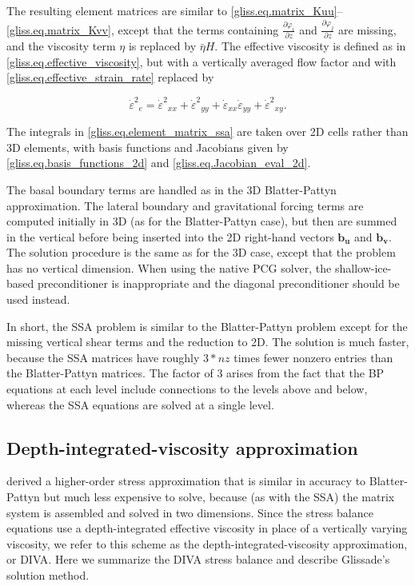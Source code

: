 {\noindent
The resulting element matrices are similar to \eqref{gliss.eq.matrix_Kuu}--\eqref{gliss.eq.matrix_Kvv},
except that the terms containing $\frac{\partial {{\varphi }_{i}}}{\partial z}$ and
$\frac{\partial {{\varphi }_{j}}}{\partial z}$ are missing, and the viscosity term $\eta$
is replaced by $\bar{\eta} H$.  The effective viscosity is defined as in \eqref{gliss.eq.effective_viscosity},
but with a vertically averaged flow factor and with \eqref{gliss.eq.effective_strain_rate} replaced by

\begin{equation}
  \label{gliss.eq.effective_strain_rate_ssa}
        {{\dot{\varepsilon }}^{2}}_{e} = 
        {{\dot{\varepsilon }}^{2}}_{xx} + {{\dot{\varepsilon }}^{2}}_{yy} + 
        {{\dot{\varepsilon }}_{xx}}{{\dot{\varepsilon }}_{yy}} + {{\dot{\varepsilon }}^{2}}_{xy}.
\end{equation}

\noindent
The integrals in \eqref{gliss.eq.element_matrix_ssa} are taken over 2D cells rather than 3D elements,
with basis functions and Jacobians given by \eqref{gliss.eq.basis_functions_2d}
and \eqref{gliss.eq.Jacobian_eval_2d}.

The basal boundary terms are handled as in the 3D Blatter-Pattyn approximation. 
The lateral boundary and gravitational forcing terms are computed initially in 3D
(as for the Blatter-Pattyn case), but then are summed in the vertical before being
inserted into the 2D right-hand vectors $\mathbf{b_u}$ and $\mathbf{b_v}$.  The solution procedure
is the same as for the 3D case, except that the problem has no vertical dimension.
When using the native PCG solver, the shallow-ice-based preconditioner is inappropriate
and the diagonal preconditioner should be used instead.  

In short, the SSA problem is similar to the Blatter-Pattyn problem except for the
missing vertical shear terms and the reduction to 2D.  The solution is much faster, because the SSA matrices
have roughly $3*nz$ times fewer nonzero entries than the Blatter-Pattyn matrices.
The factor of 3 arises from the fact that the BP equations at each level include
connections to the levels above and below, whereas the SSA equations
are solved at a single level.


\subsection{Depth-integrated-viscosity approximation}

\citet{Goldberg2011} derived a higher-order stress approximation that is similar
in accuracy to Blatter-Pattyn but much less expensive to solve, because (as with the SSA)
the matrix system is assembled and solved in two dimensions. Since the stress balance
equations use a depth-integrated effective viscosity in place of a vertically varying viscosity,
we refer to this scheme as the depth-integrated-viscosity approximation, or DIVA.
Here we summarize the DIVA stress balance and describe Glissade's solution method.

}
